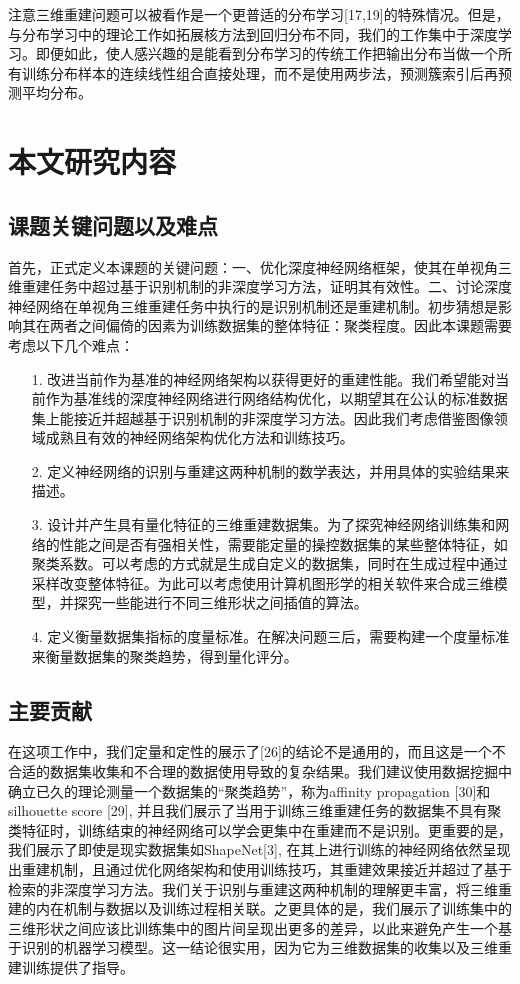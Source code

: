 \documentclass[bachelor, nocolorlinks, printoneside]{seuthesis} %
\begin{document}
\begin{Main}
注意三维重建问题可以被看作是一个更普适的分布学习[17,19]的特殊情况。但是，与分布学习中的理论工作如拓展核方法到回归分布不同，我们的工作集中于深度学习。即便如此，使人感兴趣的是能看到分布学习的传统工作把输出分布当做一个所有训练分布样本的连续线性组合直接处理，而不是使用两步法，预测簇索引后再预测平均分布。
\section{本文研究内容}
\subsection{课题关键问题以及难点}
首先，正式定义本课题的关键问题：一、优化深度神经网络框架，使其在单视角三维重建任务中超过基于识别机制的非深度学习方法，证明其有效性。二、讨论深度神经网络在单视角三维重建任务中执行的是识别机制还是重建机制。初步猜想是影响其在两者之间偏倚的因素为训练数据集的整体特征：聚类程度。因此本课题需要考虑以下几个难点：
\begin{enumerate}
    \item[1.]改进当前作为基准的神经网络架构以获得更好的重建性能。我们希望能对当前作为基准线的深度神经网络进行网络结构优化，以期望其在公认的标准数据集上能接近并超越基于识别机制的非深度学习方法。因此我们考虑借鉴图像领域成熟且有效的神经网络架构优化方法和训练技巧。
    \item[2.]定义神经网络的识别与重建这两种机制的数学表达，并用具体的实验结果来描述。
    \item[3.]设计并产生具有量化特征的三维重建数据集。为了探究神经网络训练集和网络的性能之间是否有强相关性，需要能定量的操控数据集的某些整体特征，如聚类系数。可以考虑的方式就是生成自定义的数据集，同时在生成过程中通过采样改变整体特征。为此可以考虑使用计算机图形学的相关软件来合成三维模型，并探究一些能进行不同三维形状之间插值的算法。
    \item[4.]定义衡量数据集指标的度量标准。在解决问题三后，需要构建一个度量标准来衡量数据集的聚类趋势，得到量化评分。   
\end{enumerate}
\subsection{主要贡献}
在这项工作中，我们定量和定性的展示了[26]的结论不是通用的，而且这是一个不合适的数据集收集和不合理的数据使用导致的复杂结果。我们建议使用数据挖掘中确立已久的理论测量一个数据集的“聚类趋势”，称为affinity propagation [30]和silhouette score [29], 并且我们展示了当用于训练三维重建任务的数据集不具有聚类特征时，训练结束的神经网络可以学会更集中在重建而不是识别。更重要的是，我们展示了即使是现实数据集如ShapeNet[3], 在其上进行训练的神经网络依然呈现出重建机制，且通过优化网络架构和使用训练技巧，其重建效果接近并超过了基于检索的非深度学习方法。我们关于识别与重建这两种机制的理解更丰富，将三维重建的内在机制与数据以及训练过程相关联。之更具体的是，我们展示了训练集中的三维形状之间应该比训练集中的图片间呈现出更多的差异，以此来避免产生一个基于识别的机器学习模型。这一结论很实用，因为它为三维数据集的收集以及三维重建训练提供了指导。

\end{Main}
\end{document}
